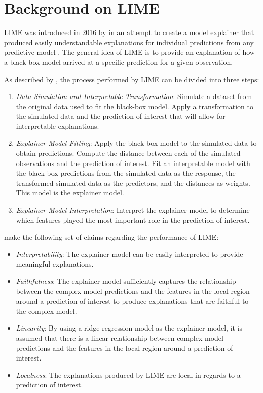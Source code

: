 \documentclass[AMS,STIX2COL]{WileyNJD-v2}\usepackage[]{graphicx}\usepackage[]{color}
\begin{document}
\section{Background on LIME} \label{background}

LIME was introduced in 2016 by \citet{ribeiro:2016} in an attempt to create a model explainer that produced easily understandable explanations for individual predictions from any predictive model \citep{ribeiro:2016}. The general idea of LIME is to provide an explanation of how a black-box model arrived at a specific prediction for a given observation.

As described by \citet{laugel:2018}, the process performed by LIME can be divided into three steps:

\begin{enumerate}

\item \emph{Data Simulation and Interpretable Transformation}: Simulate a dataset from the original data used to fit the black-box model. Apply a transformation to the simulated data and the prediction of interest that will allow for  interpretable explanations.

\item \emph{Explainer Model Fitting}: Apply the black-box model to the simulated data to obtain predictions. Compute the distance between each of the simulated observations and the prediction of interest. Fit an interpretable model with the black-box predictions from the simulated data as the response, the transformed simulated data as the predictors, and the distances as weights. This model is the explainer model.

\item \emph{Explainer Model Interpretation}: Interpret the explainer model to determine which features played the most important role in the prediction of interest.

\end{enumerate}

\citet{ribeiro:2016} make the following set of claims regarding the performance of LIME:

\begin{itemize}
\item \emph{Interpretability}: The explainer model can be easily interpreted to provide meaningful explanations.
\item \emph{Faithfulness}: The explainer model sufficiently captures the relationship between the complex model predictions and the features in the local region around a prediction of interest to produce explanations that are faithful to the complex model.
\item \emph{Linearity}: By using a ridge regression model as the explainer model, it is assumed that there is a linear relationship between complex model predictions and the features in the local region around a prediction of interest.
\item \emph{Localness}: The explanations produced by LIME are local in regards to a prediction of interest.
\end{itemize}
\end{document}

